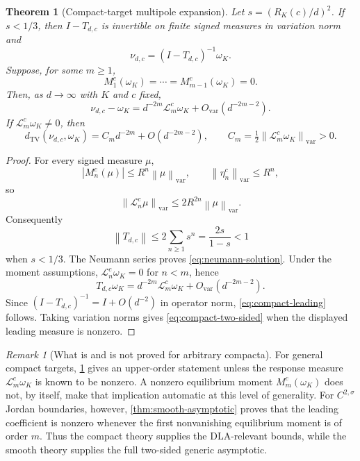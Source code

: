 \documentclass[11pt]{article}
\theoremstyle{mainthm}
\newtheorem{theorem}{Theorem}[section]
\theoremstyle{definition}
\theoremstyle{remark}
\newtheorem{remark}[remark]{Remark}
\newcommand{\dTV}{d_{\mathrm{TV}}}
\newcommand{\norm}[1]{\left\lVert #1\right\rVert}
\begin{document}
\begin{theorem}[Compact-target multipole expansion]
\label{thm:compact-neumann}
Let $s=(R_K(c)/d)^2$. If $s<1/3$, then $I-T_{d,c}$ is invertible on finite signed measures in variation norm and
\begin{equation}
  \nu_{d,c}=(I-T_{d,c})^{-1}\omega_K.
  \label{eq:neumann-solution}
\end{equation}
Suppose, for some $m\ge1$,
\[
  M_1^c(\omega_K)=\cdots=M_{m-1}^c(\omega_K)=0.
\]
Then, as $d\to\infty$ with $K$ and $c$ fixed,
\begin{equation}
  \nu_{d,c}-\omega_K
  =d^{-2m}\mathcal L_m^c\omega_K
   +O_{\mathrm{var}}(d^{-2m-2}).
  \label{eq:compact-leading}
\end{equation}
If $\mathcal L_m^c\omega_K\ne0$, then
\begin{equation}
  \dTV(\nu_{d,c},\omega_K)
  =C_m d^{-2m}+O(d^{-2m-2}),
  \qquad
  C_m=\tfrac12\norm{\mathcal L_m^c\omega_K}_{\mathrm{var}}>0.
  \label{eq:compact-two-sided}
\end{equation}
\end{theorem}

\begin{proof}
For every signed measure $\mu$,
\[
  |M_n^c(\mu)|\le R^n\norm{\mu}_{\mathrm{var}},
  \qquad
  \norm{\eta_n^c}_{\mathrm{var}}\le R^n,
\]
so
\[
  \norm{\mathcal L_n^c\mu}_{\mathrm{var}}
  \le2R^{2n}\norm{\mu}_{\mathrm{var}}.
\]
Consequently
\[
  \norm{T_{d,c}}
  \le2\sum_{n\ge1}s^n
  =\frac{2s}{1-s}<1
\]
when $s<1/3$. The Neumann series proves \eqref{eq:neumann-solution}. Under the moment assumptions, $\mathcal L_n^c\omega_K=0$ for $n<m$, hence
\[
  T_{d,c}\omega_K
  =d^{-2m}\mathcal L_m^c\omega_K
   +O_{\mathrm{var}}(d^{-2m-2}).
\]
Since $(I-T_{d,c})^{-1}=I+O(d^{-2})$ in operator norm, \eqref{eq:compact-leading} follows. Taking variation norms gives \eqref{eq:compact-two-sided} when the displayed leading measure is nonzero.
\end{proof}

\begin{remark}[What is and is not proved for arbitrary compacta]
\label{rem:compact-tradeoff}
For general compact targets, \cref{thm:compact-neumann} gives an upper-order statement unless the response measure $\mathcal L_m^c\omega_K$ is known to be nonzero. A nonzero equilibrium moment $M_m^c(\omega_K)$ does not, by itself, make that implication automatic at this level of generality. For $C^{2,\sigma}$ Jordan boundaries, however, \cref{thm:smooth-asymptotic} proves that the leading coefficient is nonzero whenever the first nonvanishing equilibrium moment is of order $m$. Thus the compact theory supplies the DLA-relevant bounds, while the smooth theory supplies the full two-sided generic asymptotic.
\end{remark}
\end{document}
